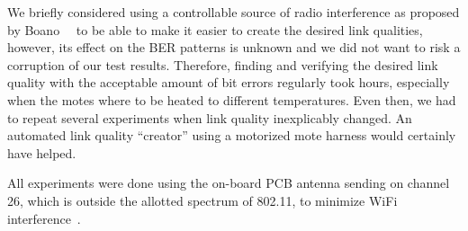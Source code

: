We briefly considered using a controllable source of radio interference as proposed by Boano~\etal~\cite{Boano2009} to be able to make it easier to create the desired link qualities, however, its effect on the \ac{BER} patterns is unknown and we did not want to risk a corruption of our test results.
Therefore, finding and verifying the desired link quality with the acceptable amount of bit errors regularly took hours, especially when the motes where to be heated to different temperatures.
Even then, we had to repeat several experiments when link quality inexplicably changed.
An automated link quality ``creator'' using a motorized mote harness would certainly have helped.

All experiments were done using the on-board PCB antenna sending on channel 26, which is outside the allotted spectrum of 802.11, to minimize WiFi interference~\cite{Liang2010}.







